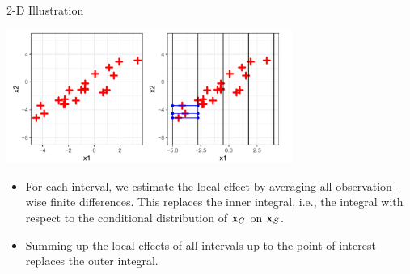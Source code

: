 \documentclass[11pt,compress,t,notes=noshow, xcolor=table]{beamer}
\begin{document}
\begin{vbframe}{2-D Illustration}
\framebreak


\begin{center}
\includegraphics[width=0.7\textwidth]{figure_man/2D01.png}
\end{center}


 \begin{itemize}
  \item For each interval, we estimate the local effect by averaging all observation-wise finite differences. This replaces the inner integral, i.e., the integral with respect to the conditional distribution of $\xv_C$ on $\xv_S$.
  \item Summing up the local effects of all intervals up to the point of interest replaces the outer integral.
\end{itemize}

\end{vbframe}
%
%
%
%
%
%
%
%
%
\end{document}
